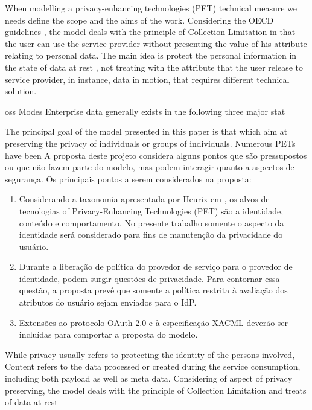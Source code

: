\documentclass{doublecol-new}
\begin{document}
When modelling a privacy-enhancing technologies (PET) technical measure we needs define the scope and the aims of the work. Considering the OECD guidelines \citep{oecd2013guidelinesupdated}, the model deals with the principle of Collection Limitation in that the user can use the service provider without presenting the value of his attribute relating to personal data. The main idea is protect the personal information in the state of data at rest \citep{liu2010data}, not treating with the attribute that the user release to service provider, in instance, data in motion, that requires different technical solution. 

oss Modes
Enterprise data generally exists in 
the following three major stat

The principal goal of the model presented in this paper is that which aim
at preserving the privacy of individuals or groups of individuals. Numerous PETs have been
A proposta deste projeto considera alguns pontos que são pressupostos ou que não fazem parte do modelo, mas podem interagir quanto a aspectos de segurança. Os principais pontos a serem considerados na proposta:
\begin{enumerate}
	\item Considerando a taxonomia apresentada por Heurix em \cite{heurix2015taxonomy}, os alvos de tecnologias of Privacy-Enhancing Technologies (PET) são a identidade, conteúdo e comportamento. No presente trabalho somente o aspecto da identidade será considerado para fins de manutenção da privacidade do usuário.
	\item Durante a liberação de política do provedor de serviço para o provedor de identidade, podem surgir questões de privacidade. Para contornar essa questão, a proposta prevê que somente a política restrita à avaliação dos atributos do usuário sejam enviados para o IdP.
	\item Extensões ao protocolo OAuth 2.0 e à especificação XACML deverão ser incluídas para comportar a proposta do modelo.
\end{enumerate}

While privacy usually refers to protecting the identity of the persons involved, Content refers to the data processed or created during the service consumption, including both payload as well as meta data. \citep{heurix2015taxonomy}
Considering of aspect of privacy preserving, the model deals with the principle of Collection Limitation \citep{oecd2013guidelinesupdated} and treats of data-at-rest \citep{liu2010data}
\end{document}
